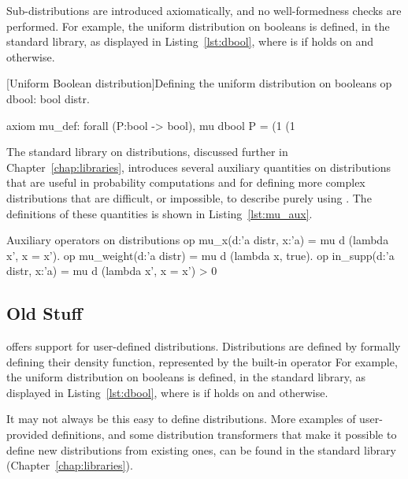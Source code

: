 Sub-distributions are introduced axiomatically, and no well-formedness checks
are performed. For example, the uniform distribution on booleans is defined, in
the standard library, as displayed in Listing~\ref{lst:dbool}, where
 is  if  holds on  and
 otherwise.

\begin{easycrypt}[label={lst:dbool}]{[Uniform Boolean distribution]Defining the uniform distribution on booleans}
op dbool: bool distr.

axiom mu_def: forall (P:bool -> bool), 
  mu dbool P =
    (1%
    (1%
\end{easycrypt}

The standard library on distributions, discussed further in
Chapter~\ref{chap:libraries}, introduces several auxiliary quantities on
distributions that are useful in probability computations and for defining more
complex distributions that are difficult, or impossible, to describe purely
using . The definitions of these quantities is shown in
Listing~\ref{lst:mu_aux}.

\begin{easycrypt}[label={lst:mu_aux}]{Auxiliary operators on distributions}
op mu_x(d:'a distr, x:'a) = mu d (lambda x', x = x').
op mu_weight(d:'a distr) = mu d (lambda x, true).
op in_supp(d:'a distr, x:'a) = mu d (lambda x', x = x') > 0%
\end{easycrypt}

\subsection{Old Stuff}
\EC offers support for user-defined distributions. Distributions are defined by
formally defining their density function, represented by the built-in operator
 For example, the uniform
distribution on booleans is defined, in the standard library, as displayed in
Listing~\ref{lst:dbool}, where  is  if 
holds on  and  otherwise.

It may not always be this easy to define distributions. More examples of
user-provided definitions, and some distribution transformers that make it
possible to define new distributions from existing ones, can be found in the
standard library (Chapter~\ref{chap:libraries}).


